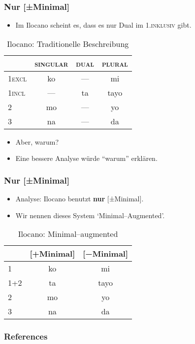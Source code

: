 \documentclass{beamer}
\begin{document}
\begin{frame}
  \frametitle{Nur [±Minimal]}
    \begin{itemize}
      \item Im Ilocano scheint es, dass es nur Dual im \textsc{1.inklusiv} gibt.
    \end{itemize}
    \begin{table}
      \caption{Ilocano: Traditionelle Beschreibung}
      \label{}
      \begin{tabular}{lccc}
        \hline
        &\textsc{singular}&\textsc{dual}&\textsc{plural}\\
        \hline
        \textsc{1excl}&ko&---&mi\\
        \textsc{1incl}&---&ta&tayo\\
        \textsc{2}&mo&---&yo\\
        \textsc{3}&na&---&da\\
        \hline
      \end{tabular}
    \end{table}
    \begin{itemize}
      \item<2-> Aber, warum?
      \item<3-> Eine bessere Analyse würde ``warum'' erklären.
    \end{itemize}
\end{frame}

\begin{frame}
  \frametitle{Nur [±Minimal]}
  \begin{itemize}
    \item Analyse: Ilocano benutzt \textbf{nur} [±Minimal].
    \item Wir nennen dieses System `Minimal--Augmented'.
  \end{itemize}
  \begin{table}
    \caption{Ilocano: Minimal--augmented}
    \label{}
      \begin{tabular}{lcc}
        \hline
        &[+Minimal]&[−Minimal]\\
        \hline
        1&ko&mi\\
        1+2&ta&tayo\\
        2&mo&yo\\
        3&na&da\\
        \hline
      \end{tabular}
  \end{table}
\end{frame}


\begin{frame}[allowframebreaks]
  \frametitle{References}
\printbibliography
\end{frame}
\end{document}
